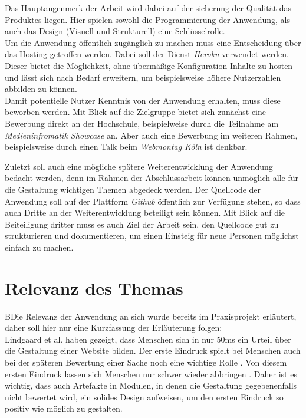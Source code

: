 Das Hauptaugenmerk der Arbeit wird dabei auf der sicherung der Qualität das Produktes liegen. Hier spielen sowohl die Programmierung der Anwendung, als auch das Design (Visuell und Strukturell) eine Schlüsselrolle. \\
Um die Anwendung öffentlich zugänglich zu machen muss eine Entscheidung über das Hosting getroffen werden. Dabei soll der Dienst \textit{Heroku} verwendet werden. Dieser bietet die Möglichkeit, ohne übermäßige Konfiguration Inhalte zu hosten und lässt sich nach Bedarf erweitern, um beispielsweise höhere Nutzerzahlen abbilden zu können. \\
Damit potentielle Nutzer Kenntnis von der Anwendung erhalten, muss diese beworben werden. Mit Blick auf die Zielgruppe bietet sich zunächst eine Bewerbung direkt an der Hochschule, beispielweise durch die Teilnahme am \textit{Medieninfromatik Showcase} an. Aber auch eine Bewerbung im weiteren Rahmen, beispielsweise durch einen Talk beim \textit{Webmontag Köln} ist denkbar.

Zuletzt soll auch eine mögliche spätere Weiterentwicklung der Anwendung bedacht werden, denn im Rahmen der Abschlussarbeit können unmöglich alle für die Gestaltung wichtigen Themen abgedeck werden. Der Quellcode der Anwendung soll auf der Plattform \textit{Github} öffentlich zur Verfügung stehen, so dass auch Dritte an der Weiterentwicklung beteiligt sein können. Mit Blick auf die Beiteiligung dritter muss es auch Ziel der Arbeit sein, den Quellcode gut zu strukturieren und dokumentieren, um einen Einsteig für neue Personen möglichst einfach zu machen.

\section{Relevanz des Themas}
BDie Relevanz der Anwendung an sich wurde bereits im Praxisprojekt erläutert, daher soll hier nur eine Kurzfassung der Erläuterung folgen:\\
Lindgaard et al. \cite{lindgaard2006attention} haben gezeigt, dass Menschen sich in nur 50ms ein Urteil über die Gestaltung einer Website bilden. Der erste Eindruck spielt bei Menschen auch bei der späteren Bewertung einer Sache noch eine wichtige Rolle \cite{campbell1996fitting}. Von diesem ersten Eindruck lassen sich Menschen nur schwer wieder abbringen \cite{nickerson1998confirmation}.
Daher ist es wichtig, dass auch Artefakte in Modulen, in denen die Gestaltung gegebenenfalls nicht bewertet wird, ein solides Design aufweisen, um den ersten Eindruck so positiv wie möglich zu gestalten.

